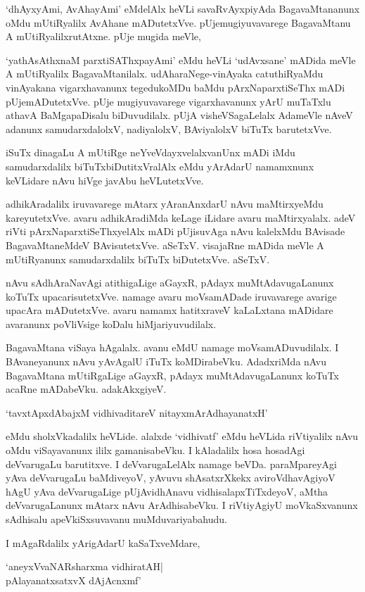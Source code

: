 `dhAyxyAmi, AvAhayAmi' eMdelAlx heVLi savaRvAyxpiyAda BagavaMtananunx oMdu mUtiRyalilx AvAhane mADutetxVve. pUjemugiyuvavarege BagavaMtanu A mUtiRyalilxrutAtxne. pUje mugida meVle,

`yathAsAthxnaM parxtiSAThxpayAmi' eMdu heVLi `udAvxsane' mADida meVle A mUtiRyalilx BagavaMtanilalx. udAharaNege-vinAyaka catuthiRyaMdu vinAyakana vigarxhavanunx tegedukoMDu baMdu pArxNaparxtiSeThx mADi pUjemADutetxVve. pUje mugiyuvavarege vigarxhavanunx yArU muTaTxlu athavA BaMgapaDisalu biDuvudilalx. pUjA visheVSagaLelalx AdameVle nAveV adanunx samudarxdalolxV, nadiyalolxV, BAviyalolxV biTuTx barutetxVve.

iSuTx dinagaLu A mUtiRge neYveVdayxvelalxvanUnx mADi iMdu samudarxdalilx biTuTxbiDutitxVralAlx eMdu yArAdarU namamxnunx keVLidare nAvu hiVge javAbu heVLutetxVve.

adhikAradalilx iruvavarege mAtarx yAranAnxdarU nAvu maMtirxyeMdu kareyutetxVve. avaru adhikAradiMda keLage iLidare avaru maMtirxyalalx. adeV riVti pArxNaparxtiSeThxyelAlx mADi pUjisuvAga nAvu kalelxMdu BAvisade BagavaMtaneMdeV BAvisutetxVve. aSeTxV. visajaRne mADida meVle A mUtiRyanunx samudarxdalilx biTuTx biDutetxVve. aSeTxV.

nAvu sAdhAraNavAgi atithigaLige aGayxR, pAdayx muMtAdavugaLanunx koTuTx upacarisutetxVve. namage avaru moVsamADade iruvavarege avarige upacAra mADutetxVve. avaru namamx hatitxraveV kaLaLxtana mADidare avaranunx poVliVsige koDalu hiMjariyuvudilalx.

BagavaMtana viSaya hAgalalx. avanu eMdU namage moVsamADuvudilalx. I BAvaneyanunx nAvu yAvAgalU iTuTx koMDirabeVku. AdadxriMda nAvu BagavaMtana mUtiRgaLige aGayxR, pAdayx muMtAdavugaLanunx koTuTx acaRne mADabeVku. adakAkxgiyeV.

\begin{shloka}
`tavxtApxdAbajxM vidhivaditareV nitayxmArAdhayanatxH'
\end{shloka} 

eMdu sholxVkadalilx heVLide. alalxde `vidhivatf' eMdu heVLida riVtiyalilx nAvu oMdu viSayavanunx ililx gamanisabeVku. I kAladalilx hosa hosadAgi deVvarugaLu barutitxve. I deVvarugaLelAlx namage beVDa. paraMpareyAgi yAva deVvarugaLu baMdiveyoV, yAvuvu shAsatxrXkekx aviroVdhavAgiyoV hAgU yAva deVvarugaLige pUjAvidhAnavu vidhisalapxTiTxdeyoV, aMtha deVvarugaLanunx mAtarx nAvu ArAdhisabeVku. I riVtiyAgiyU moVkaSxvanunx sAdhisalu apeVkiSxsuvavanu muMduvariyabahudu.

I mAgaRdalilx yArigAdarU kaSaTxveMdare,

\begin{shloka}
`aneyxVvaNARsharxma vidhiratAH|\\
pAlayanatxsatxvX dAjAcnxmf'
\end{shloka}

